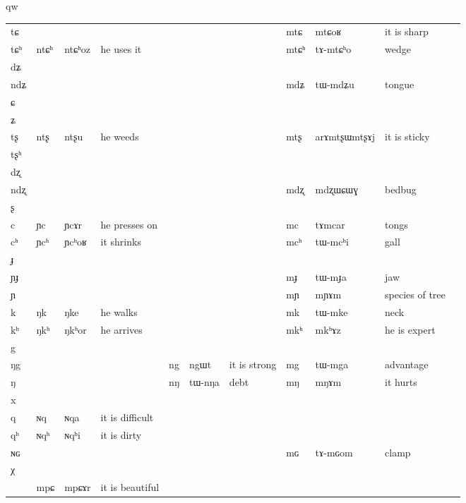 qw\documentclass[oldfontcommands,oneside,a4paper,11pt]{article}
\newcommand{\ipa}[1]{{\phon #1}} %
\begin{document}
\begin{table}
{\begin{tabular}{l|lll|lll|lll|l}
\ipa{tɕ}	&	&	&	&	&	&	&	\ipa{mtɕ}	&	\ipa{mtɕoʁ}	&	it is sharp	\\
\ipa{tɕʰ}	&	\ipa{ntɕʰ}	&	\ipa{ntɕʰoz}	&he uses it	&	&	&	&	\ipa{mtɕʰ}	&	\ipa{tɤ-mtɕʰo}	&	wedge	\\
\ipa{dʑ}	&	&	&	&	&	&	&	&	&		\\
\ipa{ndʑ}	&	&	&	&	&	&	&	\ipa{mdʑ}	&	\ipa{tɯ-mdʑu}	&	tongue	\\
\ipa{ɕ}	&	&	&	&	&	&	&	&	&		\\
\ipa{ʑ}	&	&	&	&	&	&	&	&	&		\\
\ipa{tʂ}	&	\ipa{ntʂ}	&	\ipa{ntʂu}	&	he weeds&	&	&	&	\ipa{mtʂ}	&	\ipa{arɤmtʂɯmtʂɤj}	&	it is sticky	\\
\ipa{tʂʰ}	&	&	&	&	&	&	&	&	&		\\
\ipa{dʐ}	&	&	&	&	&	&	&	&	&		\\
\ipa{ndʐ}	&	&	&	&	&	&	&	\ipa{mdʐ}	&	\ipa{mdʐɯɕɯɣ}	&	bedbug	\\
\ipa{ʂ}	&	&	&	&	&	&	&	&	&		\\
\ipa{c}	&	\ipa{ɲc}	&	\ipa{ɲcɤr}	&	he presses on&	&	&	&	\ipa{mc}	&	\ipa{tɤmcar}	&	tongs	\\
\ipa{cʰ}	&	\ipa{ɲcʰ}	&	\ipa{ɲcʰoʁ}	&	it shrinks&	&	&	&	\ipa{mcʰ}	&	\ipa{tɯ-mcʰi}	&	gall	\\
\ipa{ɟ}	&	&	&	&	&	&	&	&	&		\\
\ipa{ɲɟ}	&	&	&	&	&	&	&	\ipa{mɟ}	&	\ipa{tɯ-mɟa}	&	jaw	\\
\ipa{ɲ}	&	&	&	&	&	&	&	\ipa{mɲ}	&	\ipa{mɲɤm}	&	species of tree	\\
\ipa{k}	&	\ipa{ŋk}	&	\ipa{ŋke}	&	he walks&	&	&	&	\ipa{mk}	&	\ipa{tɯ-mke}	&	neck	\\
\ipa{kʰ}	&	\ipa{ŋkʰ}	&	\ipa{ŋkʰor}	&he arrives	&	&	&	&	\ipa{mkʰ}	&	\ipa{mkʰɤz}	&he is expert		\\
\ipa{g}	&	&	&	&	&	&	&	&	&		\\
\ipa{ŋg}	&	&	&	&	\ipa{ng}	&	\ipa{ngɯt}	&it is strong	&	\ipa{mg}	&	\ipa{tɯ-mga}	&	advantage	\\
\ipa{ŋ}	&	&	&	&	\ipa{nŋ}	&	\ipa{tɯ-nŋa}	&	debt&	\ipa{mŋ}	&	\ipa{mŋɤm}	&	it hurts	\\
\ipa{x}	&	&	&	&	&	&	&	&	&		\\
\ipa{q}	&	 	\ipa{ɴq}	&	\ipa{ɴqa}	&	it is difficult&	&		&&&&\\
\ipa{qʰ}	 	&	 	\ipa{ɴqʰ}	&	\ipa{ɴqʰi}	&	it is dirty&	&&	&	&	&\\
\ipa{ɴɢ}	 &	&&&	&	&	&	\ipa{mɢ}	&	\ipa{tɤ-mɢom}	&clamp		\\
\ipa{χ}\\
\midrule
&\ipa{mpɕ} &\ipa{mpɕɤr} & it is beautiful\\
\end{tabular}}
\end{table}
\end{document}
